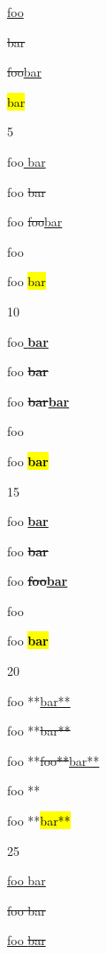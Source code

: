 \underline{foo}

\sout{bar}

\sout{foo}\underline{bar}


\hl{bar}

5

foo\underline{ bar}

foo\sout{ bar}

foo \sout{foo}\underline{bar}

foo 

foo \hl{bar}

10

foo\underline{ \textbf{bar}}

foo\sout{ \textbf{bar}}

foo \sout{\textbf{bar}}\underline{\textbf{bar}}

foo 

foo \hl{\textbf{bar}}

15

foo \textbf{\underline{bar}}

foo \textbf{\sout{bar}}

foo \textbf{\sout{foo}\underline{bar}}

foo \textbf{}

foo \textbf{\hl{bar}}

20

foo **\underline{bar**}

foo **\sout{bar**}

foo **\sout{foo**}\underline{bar**}

foo **

foo **\hl{bar**}

25

\underline{foo\underline{ bar}}

\sout{foo\sout{ bar}}

\underline{foo\sout{ bar}}
